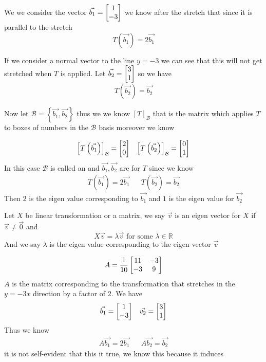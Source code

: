 \documentclass[11pt]{book}
\begin{document}
We we consider the vector $\vec{b_1} = \mat{ 1 \\ -3 } $ we know after the stretch that since it is parallel to the stretch
\[
T\left(\vec{b_1} \right) = 2 \vec{b_1} 
\]

If we consider a normal vector to the line $y= -3$ we can see that this will not get stretched when $T$ is applied. Let $\vec{b_2} = \mat{ 3 \\ 1 } $ so we have
\[
    T\left(\vec{b_2} \right) = \vec{b_2} 
\]

Now let $\mathcal{B} = \left\{ \vec{b_1} ,\vec{b_2}  \right\} $ thus we we know $\left[ T \right]_{\mathcal{B}} $ that is the matrix which applies $T$ to boxes of numbers in the $\mathcal{B} $ basis moreover we know 

\begin{align*}
    \left[ T\left(\vec{b_1} \right)  \right]_{\mathcal{B}} = \mat{ 2 \\ 0 }  && \left[ T\left(\vec{b_2} \right)  \right]_{\mathcal{B}} = \mat{ 0 \\ 1 } 
\end{align*}
In this case $\mathcal{B} $ is called an  and $\vec{b_1} , \vec{b_2} $ are  for $T$ since we know 
\begin{align*}
    T\left(\vec{b_1} \right) = 2\vec{b_1}  && T\left(\vec{b_2} \right) = \vec{b_2} 
\end{align*}
Then $2$ is the eigen value corresponding to $\vec{b_1} $ and $1$ is the eigen value for $\vec{b_2} $  

\begin{defn}\label{defn:eigen_vector}
    Let $X$ be linear transformation or a matrix, we say $\vec{v} $ is an eigen vector for $X$  if $\vec{v} \neq \vec{0} $ and
    \[
    \boxed{X\vec{v} = \lambda \vec{v} }\text{ for some  } \lambda \in \mathbb{R} 
    \]
    And we say $\lambda $ is the eigen value corresponding to the eigen vector $\vec{v} $   
\end{defn}

\begin{eg}
    \[
    A= \frac{1}{10}\mat[b]{ 11 & -3 \\ -3 & 9 }
    \]
    $A$ is the matrix corresponding to the transformation that stretches in the $y= -3x$ direction by a factor of 2. We have 
    \begin{align*}
        \vec{b_1} = \mat{ 1 \\ -3 }  && \vec{v_2} = \mat{ 3 \\ 1 } 
    \end{align*}
    Thus we know 
    \begin{align*}
        A\vec{b_1} = 2\vec{b_1}  && A\vec{b_2} = \vec{b_2} 
    \end{align*}
    it is not self-evident that this it true, we know this because it induces
\end{eg}
\end{document}
